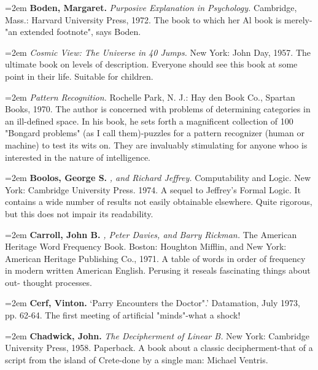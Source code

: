 \par\noindent\hangindent=2em {\bf Boden, Margaret.} {\it Purposive Explanation in Psychology.} Cambridge, Mass.: Harvard University Press, 1972. The book to which her Al book is merely- "an extended footnote", says Boden.

\par\noindent\hangindent=2em  {\it Cosmic View: The Universe in 40 Jumps.} New York: John Day, 1957. The ultimate book on levels of description. Everyone should see this book at some point in their life. Suitable for children.

\par\noindent\hangindent=2em  {\it Pattern Recognition.} Rochelle Park, N. J.: Hay den Book Co., Spartan Books, 1970. The author is concerned with problems of determining categories in an ill-defined space. In his book, he sets forth a magnificent collection of 100 "Bongard problems" (as I call them)-puzzles for a pattern recognizer (human or machine) to test its wits on. They are invaluably stimulating for anyone whoo is interested in the nature of intelligence.

\par\noindent\hangindent=2em {\bf Boolos, George S.} {\it , and Richard Jeffrey.} Computability and Logic. New York: Cambridge University Press. 1974. A sequel to Jeffrey's Formal Logic. It contains a wide number of results not easily obtainable elsewhere. Quite rigorous, but this does not impair its readability.

\par\noindent\hangindent=2em {\bf Carroll, John B.} {\it , Peter Davies, and Barry Rickman.} The American Heritage Word Frequency Book. Boston: Houghton Mifflin, and New York: American Heritage Publishing Co., 1971. A table of words in order of frequency in modern written American English. Perusing it reseals fascinating things about out- thought processes.

\par\noindent\hangindent=2em {\bf Cerf, Vinton.} `Parry Encounters the Doctor".' Datamation, July 1973, pp. 62-64. The first meeting of artificial "minds"-what a shock!

\par\noindent\hangindent=2em {\bf Chadwick, John.} {\it The Decipherment of Linear B.} New York: Cambridge University Press, 1958. Paperback. A book about a classic decipherment-that of a script from the island of Crete-done by a single man: Michael Ventris.

